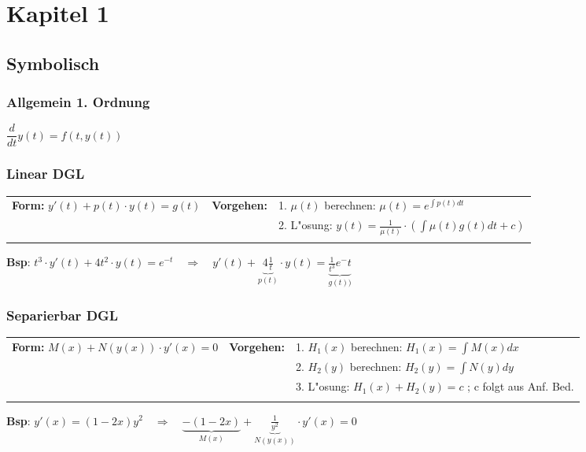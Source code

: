 \section{Kapitel 1}

\subsection{Symbolisch}

\subsubsection{Allgemein 1. Ordnung}
$\dfrac{d}{dt}y(t)=f(t,y(t))$

\subsubsection{Linear DGL}
\begin{tabular}{p{6cm}p{2cm}p{10.5cm}}
\textbf{Form:} $y'(t) + p(t) \cdot y(t) = g(t)$ &
\textbf{Vorgehen:}              &

1. $\mu(t)$ berechnen: $\mu(t) = e^{\int p(t) dt}$ \\ &&
2. L"osung: $y(t) = \frac{1}{\mu(t)} \cdot ( \int \mu(t) g(t) dt +c)$ \\ &&
\end{tabular}
\textbf{Bsp}: $t^3 \cdot y'(t) + 4 t^2 \cdot y(t) = e^{-t} \quad \Longrightarrow \quad y'(t) + \underbrace{4 \frac{1}{t}}_{p(t)} \cdot y(t) = \underbrace{\frac{1}{t^3} e^-t}_{g(t))}$

\subsubsection{Separierbar DGL}
\begin{tabular}{p{6cm}p{2cm}p{10.5cm}}
\textbf{Form:} $M(x) + N(y(x))\cdot y'(x) = 0$ &
\textbf{Vorgehen:}              &

1. $H_1(x)$ berechnen: $H_1(x) = \int M(x) dx$ \\ &&
2. $H_2(y)$ berechnen: $H_2(y) = \int N(y)dy$ \\ &&
3. L"osung: $H_1(x) + H_2(y) = c$ ; c folgt aus Anf. Bed.\\\\
\end{tabular}
\textbf{Bsp}: $y'(x) = (1-2x)y^2 \quad \Longrightarrow \quad \underbrace{-(1-2x)}_{M(x)} + \underbrace{\frac{1}{y^2}}_{N(y(x))} \cdot y'(x) = 0$


